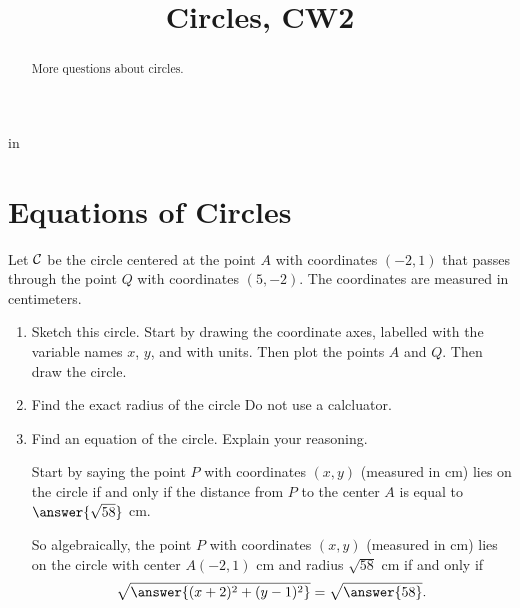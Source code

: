 \documentclass{ximera}
\title{Circles, CW2}
\newcommand{\pskip}{\vskip 0.1 in}
\begin{document}
\begin{abstract}
More questions about circles.
\end{abstract}
\maketitle


\pskip

\section{Equations of Circles}

\begin{question} \label{QDEWW9832}

Let ${\cal C}$ be the circle centered at the point $A$ with coordinates $(-2,1)$ that passes through the point $Q$ with coordinates $(5,-2)$. The coordinates are measured in centimeters.

\begin{enumerate}
\item Sketch this circle. Start by drawing the coordinate axes, labelled with the variable names $x$, $y$, and with units. Then plot the points $A$ and $Q$. Then draw the circle.

\item Find the exact radius of the circle Do not use a calcluator.

\item Find an equation of the circle. Explain your reasoning. 

Start by saying the point $P$ with coordinates $(x,y)$ (measured in cm) lies on the circle if and only if the distance from $P$ to the center $A$ is equal to $\answer{\sqrt{58}}$ cm.

So algebraically, the point $P$ with coordinates $(x,y)$ (measured in cm) lies on the circle with center $A(-2,1)$ cm and radius $\sqrt{58}$ cm if and only if
\[
     \sqrt{\answer{(x+2)^2 + (y-1)^2}}  = \sqrt{\answer{58}}.
\] 



\end{enumerate}
\end{question}
\end{document}

